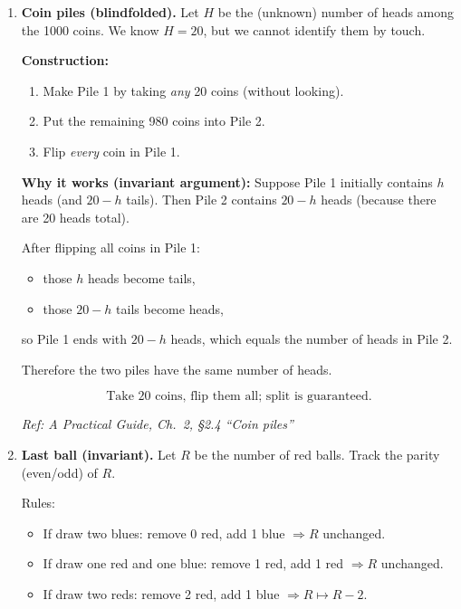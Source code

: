 \documentclass[11pt]{article}
\begin{document}
\begin{enumerate}[label=\textbf{\arabic*.}]
\medskip
\noindent\textbf{Why is it optimal?}  
The slowest two \(A\) and \(B\) must cross (cost at least 10 once). To avoid having \(A\) (or \(B\)) return with the torch (very expensive), we use the fastest returns. The above plan is the classic minimax schedule and beats alternatives like sending \(A\) with \(D\) and back, which forces a slow return.

\hfill{\small\textit{Ref: A Practical Guide, Ch.\ 2, \S2.2 ``River crossing''}}

\item \textbf{Coin piles (blindfolded).}
Let \(H\) be the (unknown) number of heads among the 1000 coins. We know \(H=20\), but we cannot identify them by touch.

\medskip
\noindent\textbf{Construction:}
\begin{enumerate}[leftmargin=2em]
\item Make Pile 1 by taking \emph{any} 20 coins (without looking).
\item Put the remaining 980 coins into Pile 2.
\item Flip \emph{every} coin in Pile 1.
\end{enumerate}

\medskip
\noindent\textbf{Why it works (invariant argument):}
Suppose Pile 1 initially contains \(h\) heads (and \(20-h\) tails). Then Pile 2 contains \(20-h\) heads (because there are 20 heads total).

After flipping all coins in Pile 1:
\begin{itemize}
\item those \(h\) heads become tails,
\item those \(20-h\) tails become heads,
\end{itemize}
so Pile 1 ends with \(20-h\) heads, which equals the number of heads in Pile 2.

Therefore the two piles have the same number of heads.

\[
\boxed{\text{Take 20 coins, flip them all; split is guaranteed.}}
\]

\hfill{\small\textit{Ref: A Practical Guide, Ch.\ 2, \S2.4 ``Coin piles''}}

\item \textbf{Last ball (invariant).}
Let \(R\) be the number of red balls. Track the parity (even/odd) of \(R\).

Rules:
\begin{itemize}
\item If draw two blues: remove 0 red, add 1 blue $\Rightarrow R$ unchanged.
\item If draw one red and one blue: remove 1 red, add 1 red $\Rightarrow R$ unchanged.
\item If draw two reds: remove 2 red, add 1 blue $\Rightarrow R\mapsto R-2$.
\end{itemize}


\end{enumerate}
\end{document}
